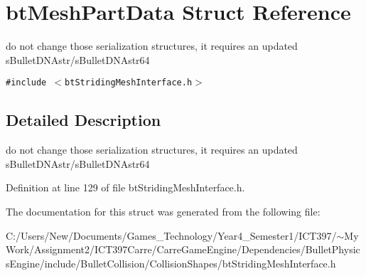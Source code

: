\hypertarget{structbt_mesh_part_data}{
\section{btMeshPartData Struct Reference}
\label{structbt_mesh_part_data}
}
do not change those serialization structures, it requires an updated sBulletDNAstr/sBulletDNAstr64  


{\tt \#include $<$btStridingMeshInterface.h$>$}



\subsection{Detailed Description}
do not change those serialization structures, it requires an updated sBulletDNAstr/sBulletDNAstr64 

Definition at line 129 of file btStridingMeshInterface.h.

The documentation for this struct was generated from the following file:\begin{CompactItemize}
\item 
C:/Users/New/Documents/Games\_\-Technology/Year4\_\-Semester1/ICT397/$\sim$My Work/Assignment2/ICT397Carre/CarreGameEngine/Dependencies/BulletPhysicsEngine/include/BulletCollision/CollisionShapes/btStridingMeshInterface.h\end{CompactItemize}
